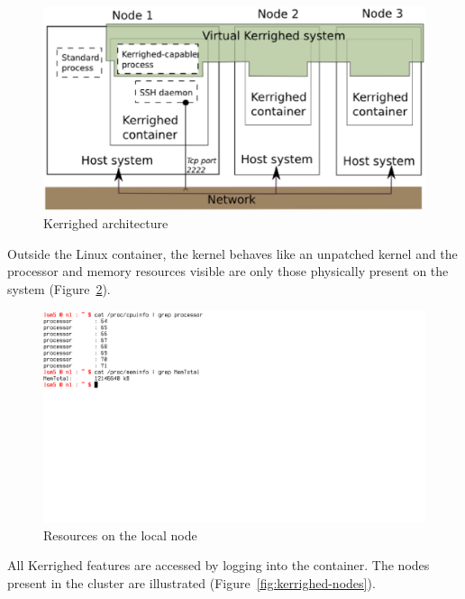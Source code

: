 \documentclass[10pt, conference, compsocconf]{IEEEtran}
\begin{document}
\begin{figure}[htbp]
 \centering
   \includegraphics[scale=0.28]{figures/kerrighed-arch}
\caption{Kerrighed architecture}
\label{fig:kerrighed-arch}
\end{figure}

Outside the Linux container, the kernel behaves like an unpatched
kernel and the processor and memory resources visible are only
those physically present on the system (Figure~\ref{fig:kerrighed-local}).

\begin{figure}[htbp]
 \centering
   \includegraphics[scale=0.28]{figures/kerrighed-local}
\caption{Resources on the local node}
\label{fig:kerrighed-local}
\end{figure}

All Kerrighed features are accessed by logging into the container.
The nodes present in the cluster are illustrated
(Figure~\ref{fig:kerrighed-nodes}).
\end{document}
